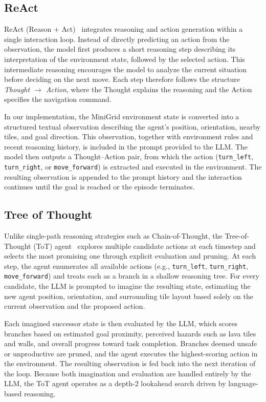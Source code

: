 \subsection{ReAct}

ReAct (Reason + Act)~\citep{yao2023react} integrates reasoning and action generation within a single interaction loop. Instead of directly predicting an action from the observation, the model first produces a short reasoning step describing its interpretation of the environment state, followed by the selected action. This intermediate reasoning encourages the model to analyze the current situation before deciding on the next move. Each step therefore follows the structure \textit{Thought $\rightarrow$ Action}, where the Thought explains the reasoning and the Action specifies the navigation command.

In our implementation, the MiniGrid environment state is converted into a structured textual observation describing the agent's position, orientation, nearby tiles, and goal direction. This observation, together with environment rules and recent reasoning history, is included in the prompt provided to the LLM. The model then outputs a Thought--Action pair, from which the action (\texttt{turn\_left}, \texttt{turn\_right}, or \texttt{move\_forward}) is extracted and executed in the environment. The resulting observation is appended to the prompt history and the interaction continues until the goal is reached or the episode terminates.
\subsection{Tree of Thought}

Unlike single-path reasoning strategies such as Chain-of-Thought\cite{yang2024buffer}, the Tree-of-Thought (ToT) agent~\cite{yao2023tree} explores multiple candidate actions at each timestep and selects the most promising one through explicit evaluation and pruning. At each step, the agent enumerates all available actions (e.g., \texttt{turn\_left}, \texttt{turn\_right}, \texttt{move\_forward}) and treats each as a branch in a shallow reasoning tree. For every candidate, the LLM is prompted to imagine the resulting state, estimating the new agent position, orientation, and surrounding tile layout based solely on the current observation and the proposed action.

Each imagined successor state is then evaluated by the LLM, which scores branches based on estimated goal proximity, perceived hazards such as lava tiles and walls, and overall progress toward task completion. Branches deemed unsafe or unproductive are pruned, and the agent executes the highest-scoring action in the environment. The resulting observation is fed back into the next iteration of the loop. Because both imagination and evaluation are handled entirely by the LLM, the ToT agent operates as a depth-2 lookahead search driven by language-based reasoning.

